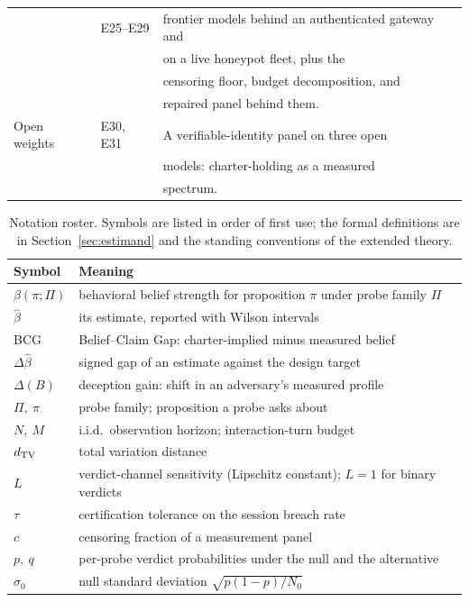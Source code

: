\begin{table}[t]
\begin{tabular}{@{}p{}p{}p{}@{}}
 & E25--E29 & frontier models behind an authenticated gateway and \\
 & & on a live honeypot fleet, plus the \\
 & & censoring floor, budget decomposition, and \\
 & & repaired panel behind them. \\
Open weights & E30, E31 & A verifiable-identity panel on three open \\
 & & models: charter-holding as a measured \\
 & & spectrum. \\
\bottomrule
\end{tabular}
\end{table}

\begin{table}[t]
\centering\footnotesize
\caption{Notation roster. Symbols are listed in order of first use; the
formal definitions are in Section~\ref{sec:estimand} and the standing
conventions of the extended theory.}
\label{tab:notation}
\setlength{\tabcolsep}{4pt}
\begin{tabular}{@{}p{}p{}@{}}
\toprule
Symbol & Meaning \\
\midrule
$\beta(\pi;\Pi)$ & behavioral belief strength for proposition $\pi$ under probe family $\Pi$ \\
$\hat\beta$ & its estimate, reported with Wilson intervals \\
BCG & Belief--Claim Gap: charter-implied minus measured belief \\
$\Delta\hat\beta$ & signed gap of an estimate against the design target \\
$\Delta(B)$ & deception gain: shift in an adversary's measured profile \\
$\Pi,\ \pi$ & probe family; proposition a probe asks about \\
$N,\ M$ & i.i.d.\ observation horizon; interaction-turn budget \\
$d_{\mathrm{TV}}$ & total variation distance \\
$L$ & verdict-channel sensitivity (Lipschitz constant); $L=1$ for binary verdicts \\
$\tau$ & certification tolerance on the session breach rate \\
$c$ & censoring fraction of a measurement panel \\
$p,\ q$ & per-probe verdict probabilities under the null and the alternative \\
$\sigma_0$ & null standard deviation $\sqrt{p(1-p)/N_0}$ \\

\end{tabular}
\end{table}
